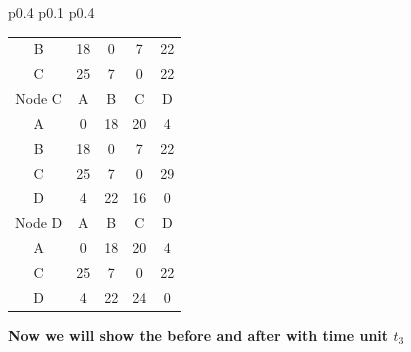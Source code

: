 \documentclass{article}
\begin{document}
\begin{tabular}{p{0.4\linewidth} p{0.1\linewidth} p{0.4\linewidth}}
\begin{tabular}{c|c|c|c|c}
    B & 18 & 0 & 7 & 22 \\
    C & 25 & 7 & 0 & 22 \\
    \hline
    \hline
    Node C & A & B & C & D \\
    \hline
    A & 0 & 18 & 20 & 4 \\
    B & 18 & 0 & 7 & 22 \\
    C & 25 & 7 & 0 & \color{red}29 \\
    D & 4 & 22 & 16 & 0 \\
    \hline
    \hline
    Node D & A & B & C & D \\
    \hline
    A & 0 & 18 & 20 & 4 \\
    C & 25 & 7 & 0 & 22 \\
    D & 4 & 22 & \color{red}24 & 0 \\
    \hline
\end{tabular}
\end{tabular}

\textbf{Now we will show the before and after with time unit $t_3$}\\
\newline
\end{document}

